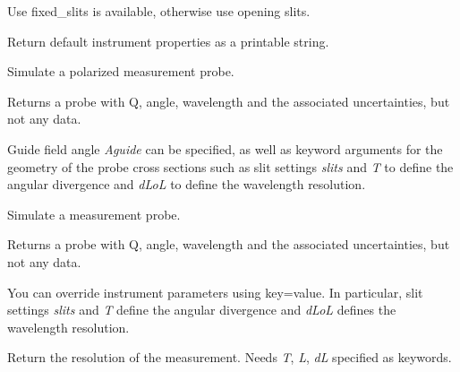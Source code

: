\documentclass[letterpaper,10pt,english]{sphinxmanual}
\begin{document}
\begin{fulllineitems}
\begin{fulllineitems}
Use fixed\_slits is available, otherwise use opening slits.

\end{fulllineitems}


\begin{fulllineitems}
\label{api/instrument:refl1d.instrument.Pulsed.defaults}
Return default instrument properties as a printable string.

\end{fulllineitems}


\begin{fulllineitems}
\label{api/instrument:refl1d.instrument.Pulsed.magnetic_probe}
Simulate a polarized measurement probe.

Returns a probe with Q, angle, wavelength and the associated
uncertainties, but not any data.

Guide field angle \emph{Aguide} can be specified, as well as keyword
arguments for the geometry of the probe cross sections such as
slit settings \emph{slits} and \emph{T} to define the angular divergence
and \emph{dLoL} to define the wavelength resolution.

\end{fulllineitems}


\begin{fulllineitems}
\label{api/instrument:refl1d.instrument.Pulsed.probe}
Simulate a measurement probe.

Returns a probe with Q, angle, wavelength and the associated
uncertainties, but not any data.

You can override instrument parameters using key=value.
In particular, slit settings \emph{slits} and \emph{T} define
the angular divergence and \emph{dLoL} defines the wavelength
resolution.

\end{fulllineitems}


\begin{fulllineitems}
\label{api/instrument:refl1d.instrument.Pulsed.resolution}
Return the resolution of the measurement.  Needs \emph{T}, \emph{L}, \emph{dL}
specified as keywords.


\end{fulllineitems}
\end{fulllineitems}
\end{document}

